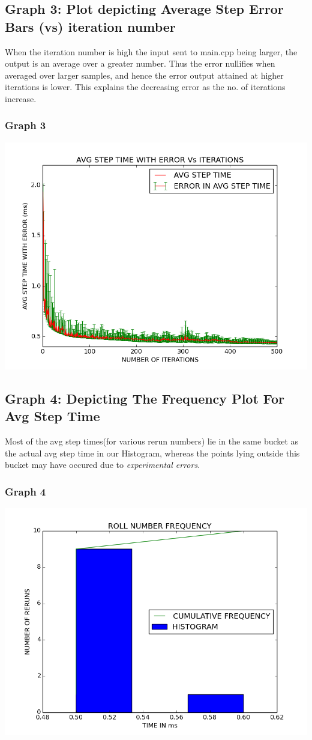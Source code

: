 \documentclass[11pt]{article}
\begin{document}
\subsection*{Graph 3: Plot depicting Average Step Error Bars (vs) iteration number}
When the iteration number is high the input sent to main.cpp being larger, the output is an average over a greater number. Thus the error nullifies when averaged over larger samples, and hence the error output attained at higher iterations is lower. This explains the decreasing error as the no. of iterations increase.
\subsubsection*{Graph 3}
\includegraphics[scale=0.35]{./images/plot3.png}
\subsection*{Graph 4: Depicting The Frequency Plot For Avg Step Time}
Most of the avg step times(for various rerun numbers) lie in the same bucket as the actual avg step time in our Histogram, whereas the points lying outside this bucket may have occured due to {\it experimental errors}.
\subsubsection*{Graph 4}
\includegraphics[scale=0.35]{./images/plot4.png}
\end{document}
